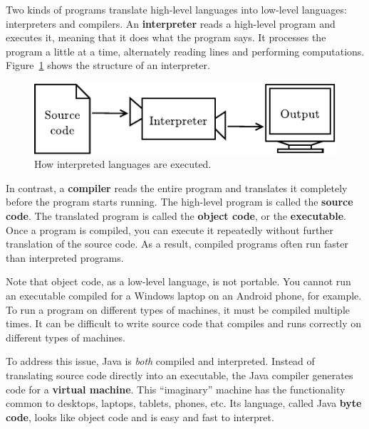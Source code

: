 
Two kinds of programs translate high-level languages into low-level languages: interpreters and compilers.
An {\bf interpreter} reads a high-level program and executes it, meaning that it does what the program says.
It processes the program a little at a time, alternately reading lines and performing computations.
Figure~\ref{fig.interpreter} shows the structure of an interpreter.

\begin{figure}[!ht]
\begin{center}
\includegraphics{figs/interpreter.pdf}
\caption{How interpreted languages are executed.}
\label{fig.interpreter}
\end{center}
\end{figure}


In contrast, a {\bf compiler} reads the entire program and translates it completely before the program starts running.
The high-level program is called the {\bf source code}.
The translated program is called the {\bf object code}, or the {\bf executable}.
Once a program is compiled, you can execute it repeatedly without further translation of the source code.
As a result, compiled programs often run faster than interpreted programs.

Note that object code, as a low-level language, is not portable.
You cannot run an executable compiled for a Windows laptop on an Android phone, for example.
To run a program on different types of machines, it must be compiled multiple times.
It can be difficult to write source code that compiles and runs correctly on different types of machines.


To address this issue, Java is {\em both} compiled and interpreted.
Instead of translating source code directly into an executable, the Java compiler generates code for a {\bf virtual machine}.
This ``imaginary'' machine has the functionality common to desktops, laptops, tablets, phones, etc.
Its language, called Java {\bf byte code}, looks like object code and is easy and fast to interpret.

